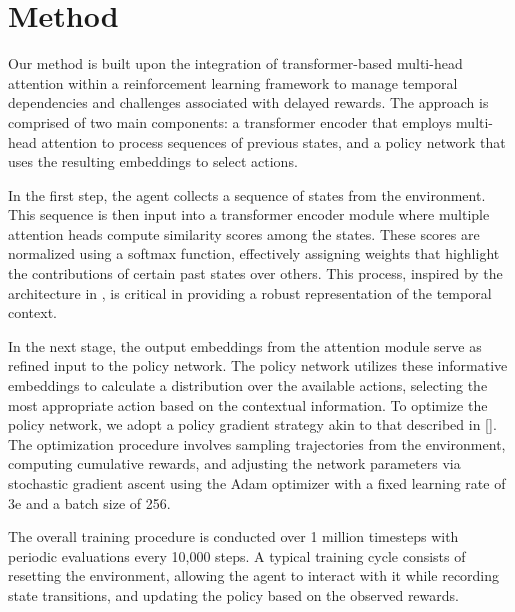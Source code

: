 \section{Method}
\label{sec:method}
Our method is built upon the integration of transformer-based multi-head attention within a reinforcement learning framework to manage temporal dependencies and challenges associated with delayed rewards. The approach is comprised of two main components: a transformer encoder that employs multi-head attention to process sequences of previous states, and a policy network that uses the resulting embeddings to select actions.

In the first step, the agent collects a sequence of states from the environment. This sequence is then input into a transformer encoder module where multiple attention heads compute similarity scores among the states. These scores are normalized using a softmax function, effectively assigning weights that highlight the contributions of certain past states over others. This process, inspired by the architecture in \cite{ashish_2017_attention}, is critical in providing a robust representation of the temporal context.

In the next stage, the output embeddings from the attention module serve as refined input to the policy network. The policy network utilizes these informative embeddings to calculate a distribution over the available actions, selecting the most appropriate action based on the contextual information. To optimize the policy network, we adopt a policy gradient strategy akin to that described in [\cite{schulman_2017_ppo}]. The optimization procedure involves sampling trajectories from the environment, computing cumulative rewards, and adjusting the network parameters via stochastic gradient ascent using the Adam optimizer with a fixed learning rate of 3e and a batch size of 256.

The overall training procedure is conducted over 1 million timesteps with periodic evaluations every 10,000 steps. A typical training cycle consists of resetting the environment, allowing the agent to interact with it while recording state transitions, and updating the policy based on the observed rewards.

